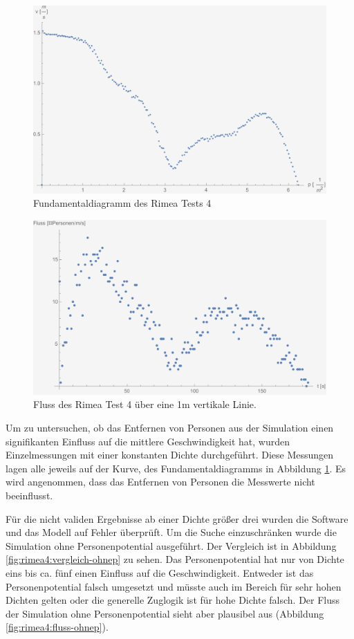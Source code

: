 \begin{figure}
	\centering
	\includegraphics[width=0.7\linewidth]{abbildungen/fundamentaldiagramm/diagramm}
	\caption{Fundamentaldiagramm des Rimea Tests 4}
	\label{fig:rimea4:diagramm}
\end{figure}

\begin{figure}
	\centering
	\includegraphics[width=0.7\linewidth]{abbildungen/fundamentaldiagramm/fluss}
	\caption{Fluss des Rimea Test 4 über eine 1m vertikale Linie.}
	\label{fig:rimea4:fluss}
\end{figure}

Um zu untersuchen, ob das Entfernen von Personen aus der Simulation einen signifikanten Einfluss auf die mittlere Geschwindigkeit hat, wurden Einzelmessungen mit einer konstanten Dichte durchgeführt. Diese Messungen lagen alle jeweils auf der Kurve, des Fundamentaldiagramms in Abbildung \ref{fig:rimea4:diagramm}. Es wird angenommen, dass das Entfernen von Personen die Messwerte nicht beeinflusst.

Für die nicht validen Ergebnisse ab einer Dichte größer drei wurden die Software und das Modell auf Fehler überprüft. Um die Suche einzuschränken wurde die Simulation ohne Personenpotential ausgeführt. Der Vergleich ist in Abbildung \ref{fig:rimea4:vergleich-ohnep} zu sehen. Das Personenpotential hat nur von Dichte eins bis ca. fünf einen Einfluss auf die Geschwindigkeit.
Entweder ist das Personenpotential falsch umgesetzt und müsste auch im Bereich für sehr hohen Dichten gelten oder die generelle Zuglogik ist für hohe Dichte falsch. Der Fluss der Simulation ohne Personenpotential sieht aber plausibel aus (Abbildung \ref{fig:rimea4:fluss-ohnep}).


